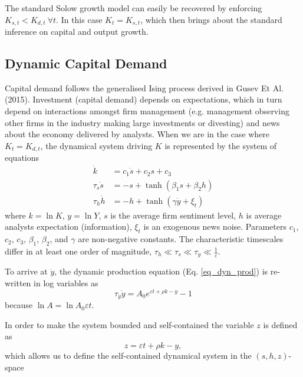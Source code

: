 \documentclass[11pt]{article}
\begin{document}
The standard Solow growth model can easily be recovered by enforcing $K_{s,t}<K_{d,t}~\forall t$. In this case $K_t = K_{s,t}$, which then brings about the standard inference on capital and output growth.

\subsection{Dynamic Capital Demand}\label{sec_dyn_demand}
Capital demand follows the generalised Ising process derived in Gusev Et Al. (2015). Investment (capital demand) depends on expectations, which in turn depend on interactions amongst firm management (e.g. management observing other firms in the industry making large investments or divesting) and news about the economy delivered by analysts.
When we are in the case where $K_t=K_{d,t}$, the dynamical system driving $K$ is represented by the system of equations
\begin{subequations}\label{eq_dyn_system_0}
\begin{align}
\dot{k}&=c_1 \dot{s} + c_2 s + c_3 \label{eq_dyn_kd}\\
\tau_s \dot{s}&=-s + \tanh( \beta_1 s + \beta_2 h) \label{eq_sentiment}\\
\tau_h \dot{h}&=-h + \tanh(\gamma \dot{y} + \xi_t)\label{eq_info}
\end{align}
\end{subequations}
where $k=\ln{K}$, $y=\ln{Y}$, $s$ is the average firm sentiment level, $h$ is average analysts expectation (information), $\xi_t$ is an exogenous news noise. Parameters $c_1$, $c_2$, $c_3$, $\beta_1$, $\beta_2$, and $\gamma$ are non-negative constants. The characteristic timescales differ in at least one order of magnitude, $\tau_h\ll\tau_s\ll\tau_y\ll\frac{1}{\varepsilon}$.

To arrive at $\dot{y}$, the dynamic production equation (Eq. \ref{eq_dyn_prod}) is re-written in log variables as
\begin{equation}\label{eq_dyn_prod_log}
\tau_y\dot{y} = A_0e^{\varepsilon t+\rho k - y} - 1
\end{equation}
because $\ln{A} = \ln{A_0}\varepsilon t$. 

In order to make the system bounded and self-contained the variable $z$ is defined as 
\begin{equation}
z = \varepsilon t + \rho k - y,
\end{equation}
which allows us to define the self-contained dynamical system in the $(s,h,z)$-space
\end{document}
